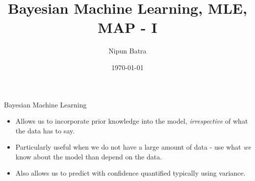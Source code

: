 \documentclass{beamer}
\title{Bayesian Machine Learning, MLE, MAP - I}
\date{\today}
\author{Nipun Batra}
\institute{IIT Gandhinagar}
\begin{document}
\maketitle

\begin{frame}{Bayesian Machine Learning}
\begin{itemize}[<+->]
\item Allows us to incorporate prior knowledge into the model, \emph{irrespective} of what the data has to say. 
\item Particularly useful when we do not have a large amount of data - use what \emph{we} know about the model than depend on the data.
\item Also allows us to predict with confidence quantified typically using variance.
\end{itemize}
\end{frame}



 
 
  
  

	
	
	
\end{document}
